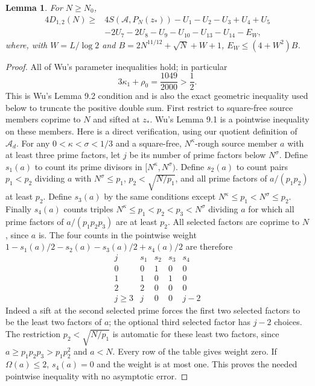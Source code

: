 \documentclass[11pt]{article}
\newtheorem{lemma}[theorem]{Lemma}
\theoremstyle{definition}
\newcommand{\A}{\mathcal A}
\begin{document}
\begin{lemma}\label{lem:wu}
For $N\ge N_0$,
\begin{equation}\label{eq:Wu-finite}
\begin{split}
4D_{1,2}(N)\ge{}&4S(\A,P_N(z_*))-U_1-U_2-U_3+U_4+U_5\\
 &-2U_7-2U_8-U_9-U_{10}-U_{13}-U_{14}-E_W,
\end{split}
\end{equation}
where, with $W=L/\log2$ and $B=2N^{11/12}+\sqrt N+W+1$,
$E_W\le(4+W^2)B$.
\end{lemma}
\begin{proof}
All of Wu's parameter inequalities hold; in particular
\[
 3\kappa_1+\rho_0=\frac{1049}{2000}>\frac12.
\]
This is Wu's Lemma 9.2 condition and is also the exact geometric
inequality used below to truncate the positive double sum.
First restrict to square-free source members coprime to $N$ and sifted
at $z_*$.  Wu's Lemma 9.1 is a pointwise inequality on these members.
Here is a direct verification, using our quotient definition of $\A_d$.
For any $0<\kappa<\sigma<1/3$ and a square-free, $N^\kappa$-rough
source member $a$ with at least three prime factors, let $j$ be its
number of prime factors below $N^\sigma$.
Define $s_1(a)$ to count its prime divisors in $[N^\kappa,N^\sigma)$.
Define $s_2(a)$ to count pairs $p_1<p_2$ dividing $a$ with
$N^\sigma\le p_1$, $p_2<\sqrt{N/p_1}$, and all prime factors of
$a/(p_1p_2)$ at least $p_2$.  Define $s_3(a)$ by the same
conditions except $N^\kappa\le p_1<N^\sigma\le p_2$.
Finally $s_4(a)$ counts triples
$N^\kappa\le p_1<p_2<p_3<N^\sigma$ dividing $a$ for which all
prime factors of $a/(p_1p_2p_3)$ are at least $p_2$.
All selected factors are coprime to $N$, since $a$ is.
The four counts in the pointwise weight
$1-s_1(a)/2-s_2(a)-s_3(a)/2+s_4(a)/2$ are therefore
\[
\begin{array}{c|cccc}
 j&s_1&s_2&s_3&s_4\\ \hline
 0&0&1&0&0\\
 1&1&0&1&0\\
 2&2&0&0&0\\
 j\ge3&j&0&0&j-2
\end{array}
\]
Indeed a sift at the second selected prime forces the first two
selected factors to be the least two factors of $a$; the optional
third selected factor has $j-2$ choices.  The restriction
$p_2<\sqrt{N/p_1}$ is automatic for these least two factors, since
$a\ge p_1p_2p_3>p_1p_2^2$ and $a<N$.
Every row of the table gives weight zero.  If $\Omega(a)\le2$,
$s_4(a)=0$ and the weight is at most one.  This proves the needed
pointwise inequality with no asymptotic error.


\end{proof}
\end{document}
